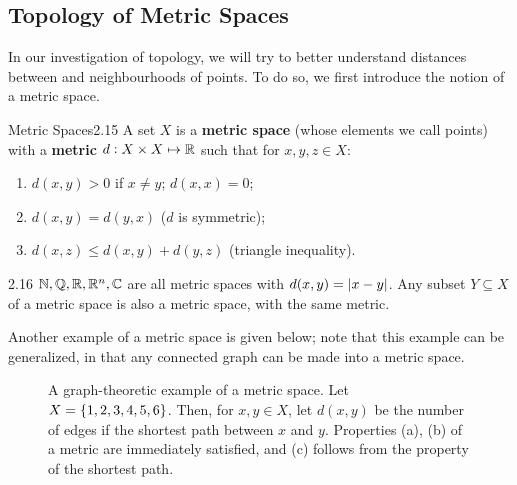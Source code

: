 \subsection{Topology of Metric Spaces}
In our investigation of topology, we will try to better understand distances between and neighbourhoods of points. To do so, we first introduce the notion of a metric space.
\begin{definition}{Metric Spaces}{2.15}
    A set $X$ is a \textbf{metric space} (whose elements we call points) with a \textbf{metric} $d: X \times X \mapsto \mathbb{R}$ such that for $x, y, z \in X$:
    \begin{enumerate}
        \item $d(x, y) > 0$ if $x \neq y$; $d(x, x) = 0$;
        \item $d(x, y) = d(y, x)$ ($d$ is symmetric);
        \item $d(x, z) \leq d(x, y) + d(y, z)$ (triangle inequality).
    \end{enumerate}
\end{definition}
\begin{example}{}{2.16}
    $\mathbb{N}, \mathbb{Q}, \mathbb{R}, \mathbb{R}^n, \mathbb{C}$ are all metric spaces with $d(x, y) = \abs{x - y}$. Any subset $Y \subseteq X$ of a metric space is also a metric space, with the same metric. 
\end{example}
\noindent Another example of a metric space is given below; note that this example can be generalized, in that any connected graph can be made into a metric space. 
\begin{figure}[htbp]
    \centering
    
    \caption{A graph-theoretic example of a metric space. Let $X = \set{1, 2, 3, 4, 5, 6}$. Then, for $x, y \in X$, let $d(x, y)$ be the number of edges if the shortest path between $x$ and $y$. Properties (a), (b) of a metric are immediately satisfied, and (c) follows from the property of the shortest path.}
    \label{fig5}
\end{figure}

